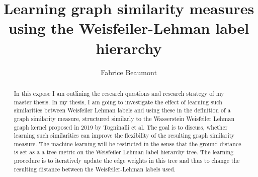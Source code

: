 


%

\title{Learning graph similarity measures using the Weisfeiler-Lehman label hierarchy}
%
%
\author{
Fabrice Beaumont%
}
%
%
%
\maketitle
%
\begin{abstract} %
In this expose I am outlining the research questions and research strategy of my master thesis. 
In my thesis, I am going to investigate the effect of learning such similarities between Weisfeiler Lehman labels and using these in the definition of a graph similarity measure, structured similarly to the Wasserstein Weisfeiler Lehman graph kernel proposed in 2019 by Togninalli et al.
The goal is to discuss, whether learning such similarities can improve the flexibility of the resulting graph similarity measure.
The machine learning will be restricted in the sense that the ground distance is set as a a tree metric on the Weisfeiler Lehman label hierarchy tree. 
The learning procedure is to iteratively update the edge weights in this tree and thus to change the resulting distance between the Weisfeiler-Lehman labels used.

\end{abstract}


